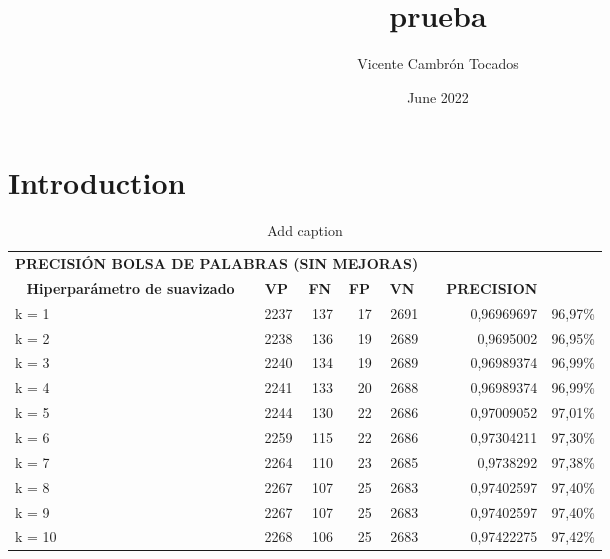 \documentclass{article}
\title{prueba}
\author{Vicente Cambrón Tocados}
\date{June 2022}
\begin{document}
\maketitle

\section{Introduction}

\begin{table}[htbp]
  \centering
  \caption{Add caption}
    \begin{tabular}{rrrrrrlr}
    \multicolumn{5}{c}{\textbf{PRECISIÓN BOLSA DE PALABRAS (SIN MEJORAS)}} &       &       &  \\
    \multicolumn{1}{c}{\textbf{Hiperparámetro de suavizado}} & \multicolumn{1}{c}{\textbf{VP}} & \multicolumn{1}{c}{\textbf{FN}} & \multicolumn{1}{c}{\textbf{FP}} & \multicolumn{1}{c}{\textbf{VN}} &       & \textbf{PRECISION} &  \\
    \multicolumn{1}{l}{k = 1} & 2237  & 137   & 17    & 2691  &       & \multicolumn{1}{r}{0,96969697} & 96,97\% \\
    \multicolumn{1}{l}{k = 2} & 2238  & 136   & 19    & 2689  &       & \multicolumn{1}{r}{0,9695002} & 96,95\% \\
    \multicolumn{1}{l}{k = 3} & 2240  & 134   & 19    & 2689  &       & \multicolumn{1}{r}{0,96989374} & 96,99\% \\
    \multicolumn{1}{l}{k = 4} & 2241  & 133   & 20    & 2688  &       & \multicolumn{1}{r}{0,96989374} & 96,99\% \\
    \multicolumn{1}{l}{k = 5} & 2244  & 130   & 22    & 2686  &       & \multicolumn{1}{r}{0,97009052} & 97,01\% \\
    \multicolumn{1}{l}{k = 6} & 2259  & 115   & 22    & 2686  &       & \multicolumn{1}{r}{0,97304211} & 97,30\% \\
    \multicolumn{1}{l}{k = 7} & 2264  & 110   & 23    & 2685  &       & \multicolumn{1}{r}{0,9738292} & 97,38\% \\
    \multicolumn{1}{l}{k = 8} & 2267  & 107   & 25    & 2683  &       & \multicolumn{1}{r}{0,97402597} & 97,40\% \\
    \multicolumn{1}{l}{k = 9} & 2267  & 107   & 25    & 2683  &       & \multicolumn{1}{r}{0,97402597} & 97,40\% \\
    \multicolumn{1}{l}{k = 10} & 2268  & 106   & 25    & 2683  &       & \multicolumn{1}{r}{0,97422275} & 97,42\% \\

\end{tabular}
\end{table}
\end{document}
